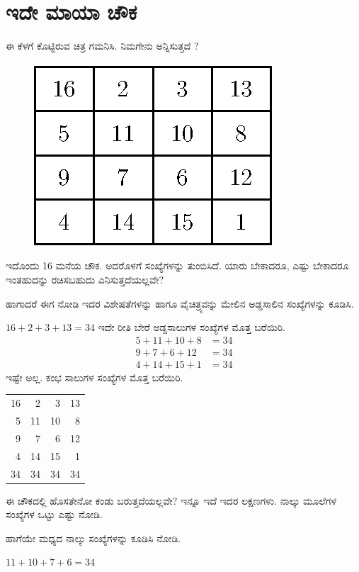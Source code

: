 \chapter{ಇದೇ ಮಾಯಾ ಚೌಕ}

ಈ ಕೆಳಗೆ ಕೊಟ್ಟಿರುವ ಚಿತ್ರ ಗಮನಿಸಿ. ನಿಮಗೇನು ಅನ್ನಿಸುತ್ತದೆ ?
\begin{figure}[H]
  \includegraphics{src/figures/chap1/fig1-1.eps}
\end{figure}
ಇದೊಂದು 16 ಮನೆಯ ಚೌಕ. ಅದರೊಳಗೆ ಸಂಖ್ಯೆಗಳನ್ನು ತುಂಬಿಸಿದೆ. ಯಾರು \break ಬೇಕಾದರೂ, ಎಷ್ಟು ಬೇಕಾದರೂ ಇಂತಹುದನ್ನು ರಚಿಸಬಹುದು ಎನಿಸುತ್ತದೆಯಲ್ಲವೇ?

ಹಾಗಾದರೆ ಈಗ ನೋಡಿ ಇದರ ವಿಶೇಷತೆಗಳನ್ನು ಹಾಗೂ ವೈಚಿತ್ರ್ಯವನ್ನು ಮೇಲಿನ ಅಡ್ಡಸಾಲಿನ ಸಂಖ್ಯೆಗಳನ್ನು ಕೂಡಿಸಿ.

$16+2+3+13=34$
ಇದೇ ರೀತಿ ಬೇರೆ ಅಡ್ಡಸಾಲುಗಳ ಸಂಖ್ಯೆಗಳ ಮೊತ್ತ ಬರೆಯಿರಿ.
\begin{align*}
5+11+10+8 & = 34\\
9+7+6+12 & = 34\\
4+14+15+1 & = 34
\end{align*}
ಇಷ್ಟೇ ಅಲ್ಲ. ಕಂಭ ಸಾಲುಗಳ ಸಂಖ್ಯೆಗಳ ಮೊತ್ತ ಬರೆಯಿರಿ.

\begin{center}
\begin{tabular}{rrrr}
16 & 2 & 3 & 13 \\
5 & 11 & 10 & 8\\
9 & 7 & 6 & 12\\
4 & 14 & 15 & 1\\
34 & 34 & 34 & 34 
\end{tabular}
\end{center}

ಈ ಚೌಕದಲ್ಲಿ ಹೊಸತೇನೋ ಕಂಡು ಬರುತ್ತದೆಯಲ್ಲವೇ? ಇನ್ನೂ ಇದೆ ಇದರ ಲಕ್ಷಣ\-ಗಳು. ನಾಲ್ಕು ಮೂಲೆಗಳ ಸಂಖ್ಯೆಗಳ ಒಟ್ಟು ಎಷ್ಟು ನೋಡಿ.

ಹಾಗೆಯೇ ಮಧ್ಯದ ನಾಲ್ಕು ಸಂಖ್ಯೆಗಳನ್ನು ಕೂಡಿಸಿ ನೋಡಿ.

$11+10+7+6 = 34$


